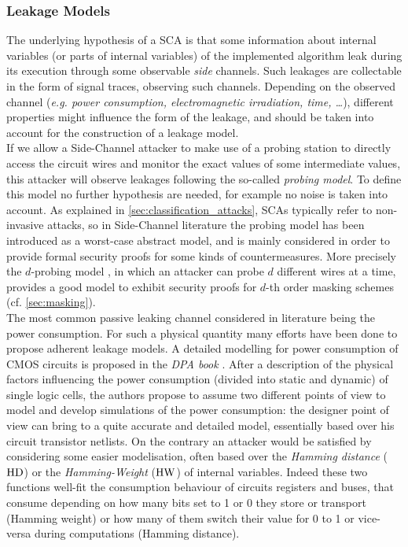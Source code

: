 \subsubsection{Leakage Models}\label{sec:leakage_model}
The underlying hypothesis of a SCA is that some information about internal variables (or parts of internal variables) of the implemented algorithm leak during its execution through some observable \emph{side} channels. Such leakages are collectable in the form of signal traces, observing such channels. Depending on the observed channel (\emph{e.g. power consumption, electromagnetic irradiation, time, \dots}), different properties might influence the form of the leakage, and should be taken into account for the construction of a leakage model.\\
If we allow a Side-Channel attacker to make use of a probing station to directly access the circuit wires and monitor the exact values of some intermediate values, this attacker will observe leakages following the so-called \emph{probing model}. To define this model no further hypothesis are needed, for example no noise is taken into account. As explained in \ref{sec:classification_attacks}, SCAs typically refer to non-invasive attacks, so in Side-Channel literature the probing model has been introduced as a worst-case abstract model, and is mainly considered in order to provide formal security proofs for some kinds of countermeasures. More precisely the $d$-probing model \cite{ishai2003private}, in which an attacker can probe $d$ different wires at a time, provides a good model to exhibit security proofs for $d$-th order masking schemes (cf. \ref{sec:masking}). \\
The most common passive leaking channel considered in literature being the power consumption. For such a physical quantity many efforts have been done to propose adherent leakage models. A detailed modelling for power consumption of CMOS circuits is proposed in the \emph{DPA book} \cite{mangard2008power}. After a description of the physical factors influencing the power consumption (divided into static and dynamic) of single logic cells, the authors propose to assume two different points of view to model and develop simulations of the power consumption: the designer point of view can bring to a quite accurate and detailed model, essentially based over his circuit transistor netlists. On the contrary an attacker would be satisfied by considering some easier modelisation, often based over the \emph{Hamming distance} ($\mathrm{HD}$) or the \emph{Hamming-Weight} ($\mathrm{HW}$) of internal variables. Indeed these two functions well-fit the consumption behaviour of circuits registers and buses, that consume depending on how many bits set to 1 or 0 they store or transport (Hamming weight) or how many of them switch their value for 0 to 1 or vice-versa during computations (Hamming distance). \\
